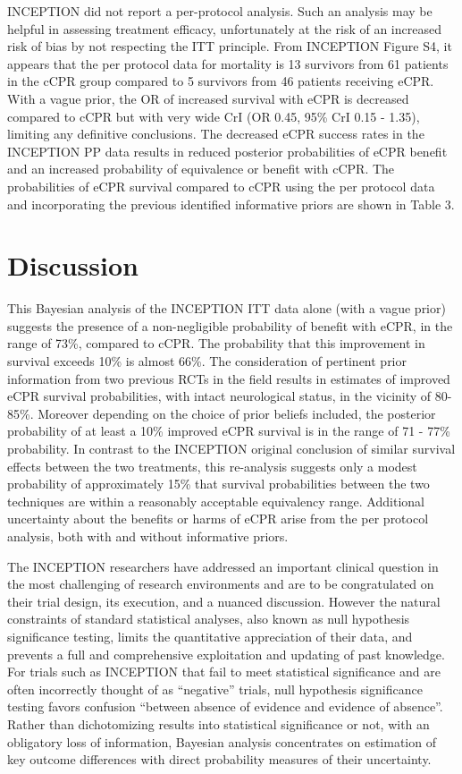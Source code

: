 \documentclass[
  super,
  preprint,
  3p]{elsarticle}
\begin{document}
INCEPTION did not report a per-protocol analysis. Such an analysis may
be helpful in assessing treatment efficacy, unfortunately at the risk of
an increased risk of bias by not respecting the ITT principle. From
INCEPTION Figure S4\citep{CPR2023a}, it appears that the per protocol
data for mortality is 13 survivors from 61 patients in the cCPR group
compared to 5 survivors from 46 patients receiving eCPR. With a vague
prior, the OR of increased survival with eCPR is decreased compared to
cCPR but with very wide CrI (OR 0.45, 95\% CrI 0.15 - 1.35), limiting
any definitive conclusions. The decreased eCPR success rates in the
INCEPTION PP data results in reduced posterior probabilities of eCPR
benefit and an increased probability of equivalence or benefit with
cCPR. The probabilities of eCPR survival compared to cCPR using the per
protocol data and incorporating the previous identified informative
priors are shown in Table 3.

\hypertarget{discussion}{%
\section{Discussion}\label{discussion}}

This Bayesian analysis of the INCEPTION ITT data alone (with a vague
prior) suggests the presence of a non-negligible probability of benefit
with eCPR, in the range of 73\%, compared to cCPR. The probability that
this improvement in survival exceeds 10\% is almost 66\%. The
consideration of pertinent prior information from two previous
RCTs\citep{RN6751, RN6759} in the field results in estimates of improved
eCPR survival probabilities, with intact neurological status, in the
vicinity of 80-85\%. Moreover depending on the choice of prior beliefs
included, the posterior probability of at least a 10\% improved eCPR
survival is in the range of 71 - 77\% probability. In contrast to the
INCEPTION original conclusion of similar survival effects between the
two treatments, this re-analysis suggests only a modest probability of
approximately 15\% that survival probabilities between the two
techniques are within a reasonably acceptable equivalency range.
Additional uncertainty about the benefits or harms of eCPR arise from
the per protocol analysis, both with and without informative priors.

The INCEPTION researchers have addressed an important clinical question
in the most challenging of research environments and are to be
congratulated on their trial design, its execution, and a nuanced
discussion. However the natural constraints of standard statistical
analyses, also known as null hypothesis significance testing, limits the
quantitative appreciation of their data, and prevents a full and
comprehensive exploitation and updating of past knowledge. For trials
such as INCEPTION that fail to meet statistical significance and are
often incorrectly thought of as ``negative'' trials, null hypothesis
significance testing favors confusion ``between absence of evidence and
evidence of absence''\citep{RN6765}. Rather than dichotomizing results
into statistical significance or not, with an obligatory loss of
information, Bayesian analysis concentrates on estimation of key outcome
differences with direct probability measures of their uncertainty.
\end{document}

